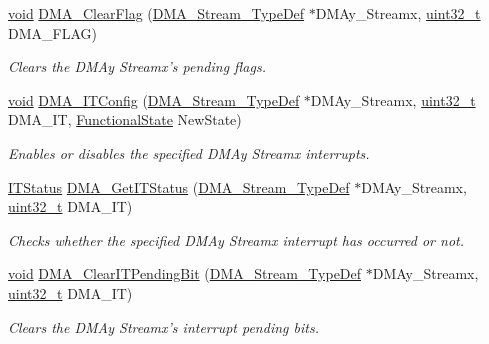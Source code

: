 \begin{DoxyCompactItemize}
\hyperlink{group___n_a_m_e_ga18028b8badbf1ea7e704ccac3c488e82}{void} \hyperlink{group___d_m_a___group4_ga510d62b4051f5a5de164e84b266b851d}{D\-M\-A\-\_\-\-Clear\-Flag} (\hyperlink{struct_d_m_a___stream___type_def}{D\-M\-A\-\_\-\-Stream\-\_\-\-Type\-Def} $\ast$D\-M\-Ay\-\_\-\-Streamx, \hyperlink{stdint_8h_a435d1572bf3f880d55459d9805097f62}{uint32\-\_\-t} D\-M\-A\-\_\-\-F\-L\-A\-G)
\begin{DoxyCompactList}\small\item\em Clears the D\-M\-Ay Streamx's pending flags. \end{DoxyCompactList}\item 
\hyperlink{group___n_a_m_e_ga18028b8badbf1ea7e704ccac3c488e82}{void} \hyperlink{group___d_m_a___group4_gab9c469a3f5d4aca5c97dee798ffc2f05}{D\-M\-A\-\_\-\-I\-T\-Config} (\hyperlink{struct_d_m_a___stream___type_def}{D\-M\-A\-\_\-\-Stream\-\_\-\-Type\-Def} $\ast$D\-M\-Ay\-\_\-\-Streamx, \hyperlink{stdint_8h_a435d1572bf3f880d55459d9805097f62}{uint32\-\_\-t} D\-M\-A\-\_\-\-I\-T, \hyperlink{group___exported__types_gac9a7e9a35d2513ec15c3b537aaa4fba1}{Functional\-State} New\-State)
\begin{DoxyCompactList}\small\item\em Enables or disables the specified D\-M\-Ay Streamx interrupts. \end{DoxyCompactList}\item 
\hyperlink{group___exported__types_gaacbd7ed539db0aacd973a0f6eca34074}{I\-T\-Status} \hyperlink{group___d_m_a___group4_gad0ccf5f6548bd7cf8f2cae30393bb716}{D\-M\-A\-\_\-\-Get\-I\-T\-Status} (\hyperlink{struct_d_m_a___stream___type_def}{D\-M\-A\-\_\-\-Stream\-\_\-\-Type\-Def} $\ast$D\-M\-Ay\-\_\-\-Streamx, \hyperlink{stdint_8h_a435d1572bf3f880d55459d9805097f62}{uint32\-\_\-t} D\-M\-A\-\_\-\-I\-T)
\begin{DoxyCompactList}\small\item\em Checks whether the specified D\-M\-Ay Streamx interrupt has occurred or not. \end{DoxyCompactList}\item 
\hyperlink{group___n_a_m_e_ga18028b8badbf1ea7e704ccac3c488e82}{void} \hyperlink{group___d_m_a___group4_gad5433018889cd36140d98bb380c4e76e}{D\-M\-A\-\_\-\-Clear\-I\-T\-Pending\-Bit} (\hyperlink{struct_d_m_a___stream___type_def}{D\-M\-A\-\_\-\-Stream\-\_\-\-Type\-Def} $\ast$D\-M\-Ay\-\_\-\-Streamx, \hyperlink{stdint_8h_a435d1572bf3f880d55459d9805097f62}{uint32\-\_\-t} D\-M\-A\-\_\-\-I\-T)
\begin{DoxyCompactList}\small\item\em Clears the D\-M\-Ay Streamx's interrupt pending bits. \end{DoxyCompactList}\end{DoxyCompactItemize}


